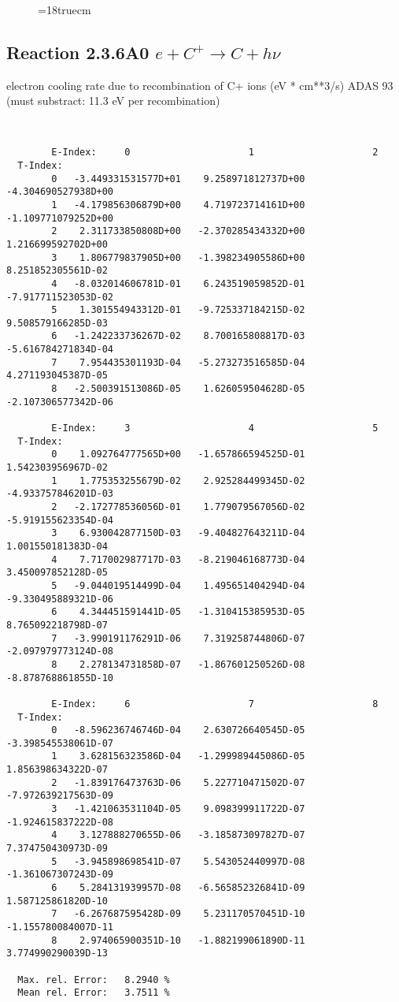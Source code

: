 \begin{figure} \label{2.6il}
\epsfxsize=18truecm
\end{figure}
\newpage

\subsection{
  Reaction 2.3.6A0  $e + C^+  \rightarrow C   + h\nu $
}
electron cooling rate due to recombination of C+ ions (eV * cm**3/s)
ADAS 93  (must substract: 11.3 eV per recombination)

\begin{verbatim}


        E-Index:     0                     1                     2
  T-Index:
        0   -3.449331531577D+01    9.258971812737D+00   -4.304690527938D+00
        1   -4.179856306879D+00    4.719723714161D+00   -1.109771079252D+00
        2    2.311733850808D+00   -2.370285434332D+00    1.216699592702D+00
        3    1.806779837905D+00   -1.398234905586D+00    8.251852305561D-02
        4   -8.032014606781D-01    6.243519059852D-01   -7.917711523053D-02
        5    1.301554943312D-01   -9.725337184215D-02    9.508579166285D-03
        6   -1.242233736267D-02    8.700165808817D-03   -5.616784271834D-04
        7    7.954435301193D-04   -5.273273516585D-04    4.271193045387D-05
        8   -2.500391513086D-05    1.626059504628D-05   -2.107306577342D-06

        E-Index:     3                     4                     5
  T-Index:
        0    1.092764777565D+00   -1.657866594525D-01    1.542303956967D-02
        1    1.775353255679D-02    2.925284499345D-02   -4.933757846201D-03
        2   -2.172778536056D-01    1.779079567056D-02   -5.919155623354D-04
        3    6.930042877150D-03   -9.404827643211D-04    1.001550181383D-04
        4    7.717002987717D-03   -8.219046168773D-04    3.450097852128D-05
        5   -9.044019514499D-04    1.495651404294D-04   -9.330495889321D-06
        6    4.344451591441D-05   -1.310415385953D-05    8.765092218798D-07
        7   -3.990191176291D-06    7.319258744806D-07   -2.097979773124D-08
        8    2.278134731858D-07   -1.867601250526D-08   -8.878768861855D-10

        E-Index:     6                     7                     8
  T-Index:
        0   -8.596236746746D-04    2.630726640545D-05   -3.398545538061D-07
        1    3.628156323586D-04   -1.299989445086D-05    1.856398634322D-07
        2   -1.839176473763D-06    5.227710471502D-07   -7.972639217563D-09
        3   -1.421063531104D-05    9.098399911722D-07   -1.924615837222D-08
        4    3.127888270655D-06   -3.185873097827D-07    7.374750430973D-09
        5   -3.945898698541D-07    5.543052440997D-08   -1.361067307243D-09
        6    5.284131939957D-08   -6.565852326841D-09    1.587125861820D-10
        7   -6.267687595428D-09    5.231170570451D-10   -1.155780084007D-11
        8    2.974065900351D-10   -1.882199061890D-11    3.774990290039D-13

  Max. rel. Error:   8.2940 %
  Mean rel. Error:   3.7511 %



\end{verbatim}
